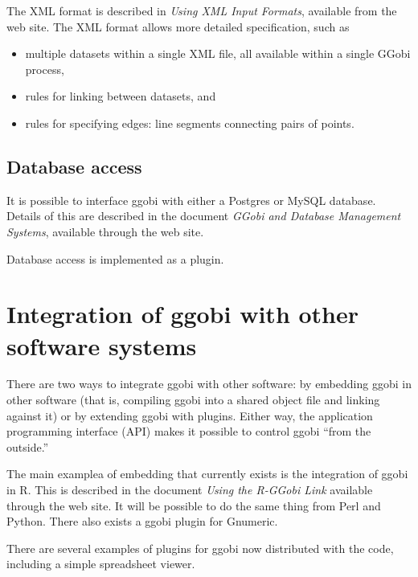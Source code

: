 \documentclass[11pt]{article}
\begin{document}
The XML format is described in {\em Using XML Input Formats},
available from the web site.  The XML format allows more detailed
specification, such as

\begin{itemize}
\item multiple datasets within a single XML file, all available within
      a single GGobi process,
\item rules for linking between datasets, and
\item rules for specifying edges: line segments connecting pairs of points.
\end{itemize}

\subsection {Database access}
\label{slbl:MySQL}

It is possible to interface ggobi with either a Postgres or MySQL
database. Details of this are described in the document {\em GGobi and
Database Management Systems}, available through the web site. 

Database access is implemented as a plugin.

\section{Integration of ggobi with other software systems}
\label{slbl:Integration}

There are two ways to integrate ggobi with other software: by embedding
ggobi in other software (that is, compiling ggobi into a shared object
file and linking against it) or by extending ggobi with plugins.  Either
way, the application programming interface (API) makes it possible to
control ggobi ``from the outside.''

The main examplea of embedding that currently exists is the integration
of ggobi in R. This is described in the document {\em Using the R-GGobi
Link} available through the web site.   It will be possible to do the
same thing from Perl and Python.  There also exists a ggobi plugin
for Gnumeric.

There are several examples of plugins for ggobi now distributed with
the code, including a simple spreadsheet viewer.
\end{document}
